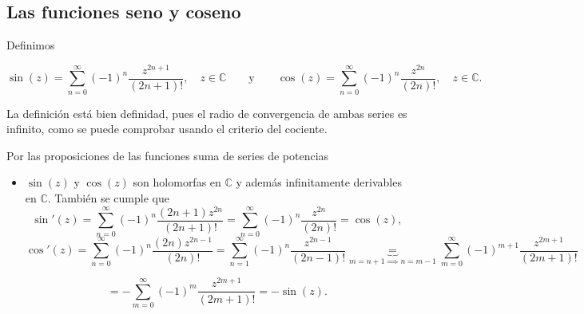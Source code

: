 \begin{itemize}
\begin{center}
    \end{center}
\end{itemize}

\subsection{Las funciones seno y coseno}

Definimos 

\[
    \sin(z) = \sum_{n=0}^{\infty} (-1)^n \frac{z^{2n+1}}{(2n+1)!}, \quad z \in \mathbb{C} \qquad \text{y} \qquad \cos(z) = \sum_{n=0}^{\infty} (-1)^n \frac{z^{2n}}{(2n)!}, \quad z \in \mathbb{C}.
\]

La definición está bien definidad, pues el radio de convergencia de ambas series es infinito, como se puede comprobar usando el criterio del cociente.

Por las proposiciones de las funciones suma de series de potencias

\begin{itemize}
    \item $\sin(z)$ y $\cos(z)$ son holomorfas en $\mathbb{C}$ y además infinitamente derivables en $\mathbb{C}$. También se cumple que
    \[
        \sin'(z) = \sum_{n=0}^{\infty} (-1)^n \frac{(2n+1)z^{2n}}{(2n+1)!} = \sum_{n=0}^{\infty} (-1)^n \frac{z^{2n}}{(2n)!} = \cos(z),
    \]
    \[
        \cos'(z) = \sum_{n=0}^{\infty} (-1)^n \frac{(2n)z^{2n-1}}{(2n)!} = \sum_{n=1}^{\infty} (-1)^{n} \frac{z^{2n-1}}{(2n-1)!} \underbrace{=}_{m=n+1 \implies n=m-1} \sum_{m=0}^{\infty} (-1)^{m+1} \frac{z^{2m+1}}{(2m+1)!}
    \]

    \[
        = -\sum_{m=0}^{\infty} (-1)^m \frac{z^{2m+1}}{(2m+1)!} = -\sin(z).
    \]
\end{itemize}

